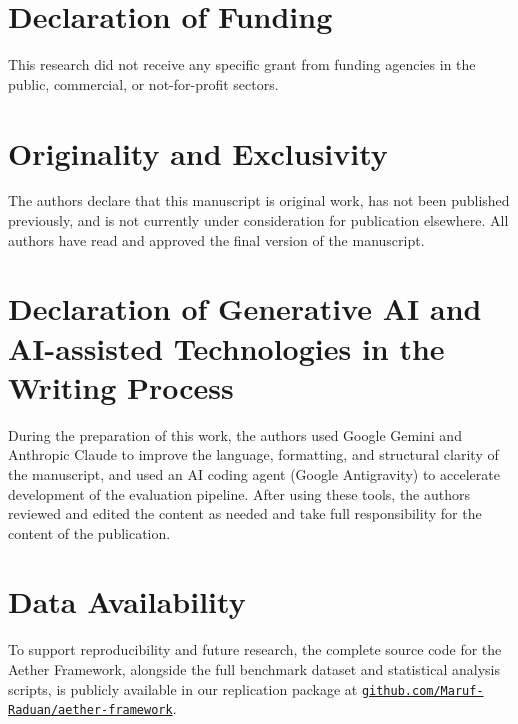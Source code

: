 \documentclass[review,12pt,3p]{elsarticle}
\begin{document}
\section*{Declaration of Funding}
This research did not receive any specific grant from funding agencies in the public, commercial, or not-for-profit sectors.

\section*{Originality and Exclusivity}
The authors declare that this manuscript is original work, has not been published previously, and is not currently under consideration for publication elsewhere. All authors have read and approved the final version of the manuscript.

\section*{Declaration of Generative AI and AI-assisted Technologies in the Writing Process}
During the preparation of this work, the authors used Google Gemini and Anthropic Claude to improve the language, formatting, and structural clarity of the manuscript, and used an AI coding agent (Google Antigravity) to accelerate development of the evaluation pipeline. After using these tools, the authors reviewed and edited the content as needed and take full responsibility for the content of the publication.


\section*{Data Availability}

To support reproducibility and future research, the complete source code for the Aether
Framework, alongside the full benchmark dataset and statistical analysis scripts, is
publicly available in our replication package at
\href{https://github.com/Maruf-Raduan/aether-framework}{\texttt{github.com/Maruf-Raduan/aether-framework}}.



\end{document}
